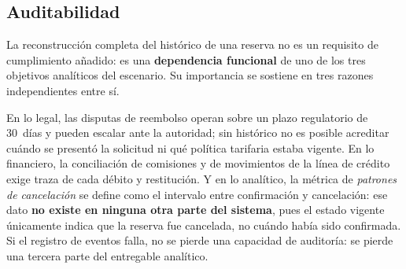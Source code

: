 \documentclass[10pt,letterpaper]{article}
\begin{document}
\subsection{Auditabilidad}
La reconstrucción completa del histórico de una reserva no es un requisito de cumplimiento añadido: es una \textbf{dependencia funcional} de uno de los tres objetivos analíticos del escenario. Su importancia se sostiene en tres razones independientes entre sí.

En lo legal, las disputas de reembolso operan sobre un plazo regulatorio de 30~días y pueden escalar ante la autoridad; sin histórico no es posible acreditar cuándo se presentó la solicitud ni qué política tarifaria estaba vigente. En lo financiero, la conciliación de comisiones y de movimientos de la línea de crédito exige traza de cada débito y restitución. Y en lo analítico, la métrica de \emph{patrones de cancelación} se define como el intervalo entre confirmación y cancelación: ese dato \textbf{no existe en ninguna otra parte del sistema}, pues el estado vigente únicamente indica que la reserva fue cancelada, no cuándo había sido confirmada. Si el registro de eventos falla, no se pierde una capacidad de auditoría: se pierde una tercera parte del entregable analítico.
\end{document}

